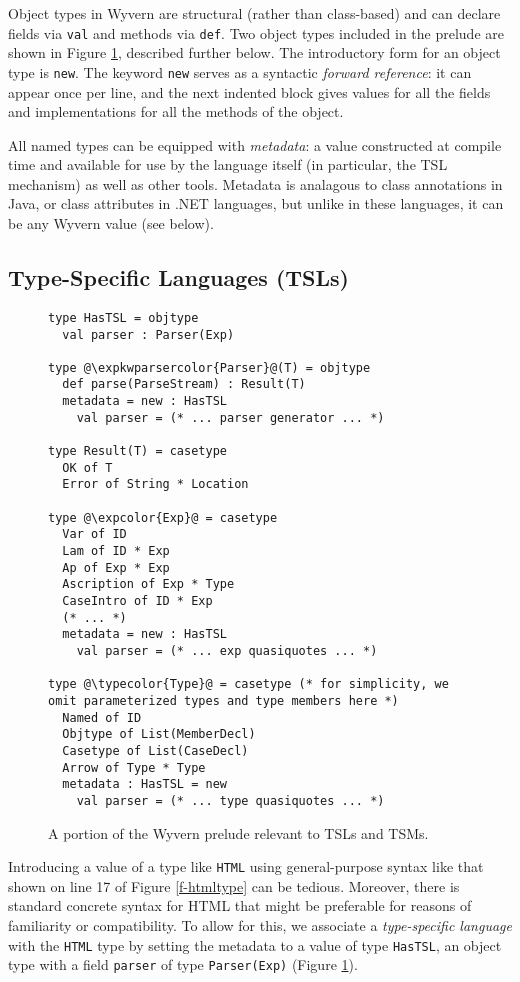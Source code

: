\documentclass{sig-alternate}
\newcommand{\expkwparsercolor}[1]{\textcolor[HTML]{336699}{#1}}
\newcommand{\expcolor}[1]{\textcolor[HTML]{FF0033}{#1}}
\newcommand{\typecolor}[1]{\textcolor[HTML]{660066}{#1}}
\newcommand{\mycaption}[1]{\vspace{-4px}\caption{#1}\vspace{-2px}}
\begin{document}
Object types in Wyvern are structural (rather than class-based) and can declare fields via \texttt{val} and methods via \texttt{def}. Two object types included in the prelude are shown in Figure \ref{exp-prelude}, described further below. The introductory form for an object type is \verb|new|. The keyword \verb|new| serves as a syntactic \emph{forward reference}: it can appear once per line, and the next indented block gives values for all the fields and implementations for all the methods of the object. %


All named types can be equipped with \emph{metadata}: a value constructed at compile time and available for use by the language itself (in particular, the TSL mechanism) as well as other tools. Metadata is analagous to class annotations in Java, or class attributes in .NET languages, but unlike in these languages, it can be any Wyvern value (see below). %

\subsection{Type-Specific Languages (TSLs)}


\begin{figure}[t!]
\begin{lstlisting}[style=wyvern]
type HasTSL = objtype
  val parser : Parser(Exp)

type @\expkwparsercolor{Parser}@(T) = objtype
  def parse(ParseStream) : Result(T)
  metadata = new : HasTSL
    val parser = (* ... parser generator ... *)

type Result(T) = casetype
  OK of T
  Error of String * Location

type @\expcolor{Exp}@ = casetype
  Var of ID
  Lam of ID * Exp
  Ap of Exp * Exp
  Ascription of Exp * Type
  CaseIntro of ID * Exp
  (* ... *)
  metadata = new : HasTSL
    val parser = (* ... exp quasiquotes ... *)

type @\typecolor{Type}@ = casetype (* for simplicity, we omit parameterized types and type members here *)
  Named of ID
  Objtype of List(MemberDecl)
  Casetype of List(CaseDecl)
  Arrow of Type * Type
  metadata : HasTSL = new
    val parser = (* ... type quasiquotes ... *)
\end{lstlisting}
\mycaption{A portion of the Wyvern prelude relevant to TSLs and TSMs.}
\label{exp-prelude}
\end{figure}

Introducing a value of a type like \verb|HTML| using general-purpose syntax like that shown on line 17 of Figure \ref{f-htmltype} can be tedious. Moreover, there is standard concrete syntax for HTML that might be preferable for reasons of familiarity or compatibility. To allow for this, we associate a \emph{type-specific language} with the \verb|HTML| type by setting the metadata to a value of type \verb|HasTSL|, an object type with a field \verb|parser| of type \verb|Parser(Exp)| (Figure \ref{exp-prelude}). 
\end{document}
